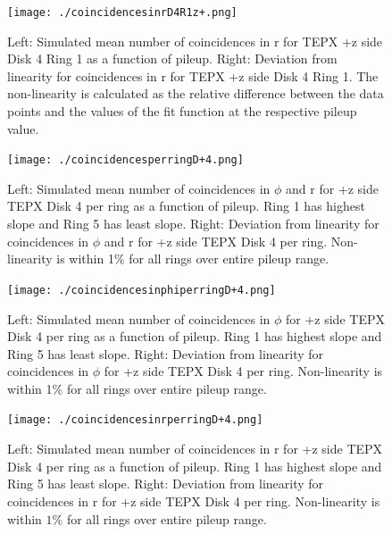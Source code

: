 \begin{figure}[H]
  \centering
  \texttt{[image: ./coincidencesinrD4R1z+.png]}
  \caption{Left: Simulated mean number of coincidences in r for TEPX +z side Disk 4 Ring 1 as a function of pileup. Right: Deviation from linearity for coincidences in r for TEPX +z side Disk 4 Ring 1. The non-linearity is calculated as the relative difference between the data points and the values of the fit function at the respective pileup value.}
  \label{fig:CMS}
\end{figure}





\begin{figure}[H]
  \centering
  \texttt{[image: ./coincidencesperringD+4.png]}
  \caption{Left: Simulated mean number of coincidences in $\phi$ and r for +z side TEPX Disk 4 per ring as a function of pileup. Ring 1 has highest slope and Ring 5 has least slope. Right: Deviation from linearity for coincidences in $\phi$ and r for +z side TEPX Disk 4 per ring. Non-linearity is within 1\% for all rings over entire pileup range.}
  \label{fig:CMS}
\end{figure}








\begin{figure}[H]
  \centering
  \texttt{[image: ./coincidencesinphiperringD+4.png]}
  \caption{Left: Simulated mean number of coincidences in $\phi$ for +z side TEPX Disk 4 per ring as a function of pileup. Ring 1 has highest slope and Ring 5 has least slope. Right: Deviation from linearity for coincidences in $\phi$ for +z side TEPX Disk 4 per ring. Non-linearity is within 1\% for all rings over entire pileup range.}
  \label{fig:CMS}
\end{figure}





\begin{figure}[H]
  \centering
  \texttt{[image: ./coincidencesinrperringD+4.png]}
  \caption{Left: Simulated mean number of coincidences in r for +z side TEPX Disk 4 per ring as a function of pileup. Ring 1 has highest slope and Ring 5 has least slope. Right: Deviation from linearity for coincidences in r for +z side TEPX Disk 4 per ring. Non-linearity is within $1\%$ for all rings over entire pileup range.}
  \label{fig:CMS}
\end{figure}


